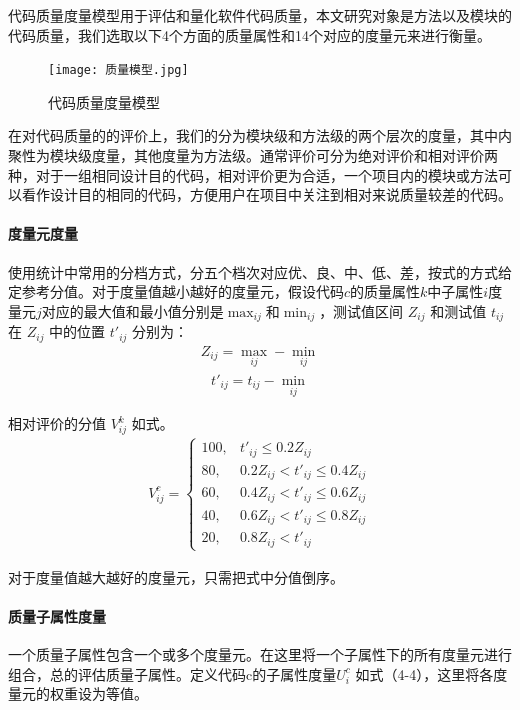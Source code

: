 代码质量度量模型用于评估和量化软件代码质量，本文研究对象是方法以及模块的代码质量，我们选取以下4个方面的质量属性和14个对应的度量元来进行衡量。

\begin{figure}[h]
\centering
\texttt{[image: 质量模型.jpg]}
\caption{代码质量度量模型}
\end{figure}

在对代码质量的的评价上，我们的分为模块级和方法级的两个层次的度量，其中内聚性为模块级度量，其他度量为方法级。通常评价可分为绝对评价和相对评价两种，对于一组相同设计目的代码，相对评价更为合适\cite{黄沛杰2011代码质量静态度量的研究与应用}，一个项目内的模块或方法可以看作设计目的相同的代码，方便用户在项目中关注到相对来说质量较差的代码。

\paragraph{度量元度量} 使用统计中常用的分档方式，分五个档次对应优、良、中、低、差，按式的方式给定参考分值。对于度量值越小越好的度量元，假设代码$c$的质量属性$k$中子属性$i$度量元$j$对应的最大值和最小值分别是$\max_{ij}$和$\min_{ij}$，测试值区间 \(Z_{ij}\) 和测试值 \(t_{ij}\) 在 \(Z_{ij}\) 中的位置 \(t'_{ij}\) 分别为：
\begin{align}
Z_{ij} = \max_{ij} - \min_{ij}
\end{align}
\begin{align}
t'_{ij} = t_{ij} - \min_{ij}
\end{align}

相对评价的分值 \(V_{ij}^k\) 如式。
\begin{align}
V_{ij}^c = 
\begin{cases} 
100, & t'_{ij} \leq 0.2Z_{ij} \\ 
80, & 0.2Z_{ij} < t'_{ij} \leq 0.4Z_{ij} \\ 
60, & 0.4Z_{ij} < t'_{ij} \leq 0.6Z_{ij} \\ 
40, & 0.6Z_{ij} < t'_{ij} \leq 0.8Z_{ij} \\ 
20, & 0.8Z_{ij} < t'_{ij}
\end{cases}
\end{align}

对于度量值越大越好的度量元，只需把式中分值倒序。

\paragraph{质量子属性度量} 一个质量子属性包含一个或多个度量元。在这里将一个子属性下的所有度量元进行组合，总的评估质量子属性。定义代码c的子属性度量$U_{i}^c$ 如式（4-4），这里将各度量元的权重设为等值。

